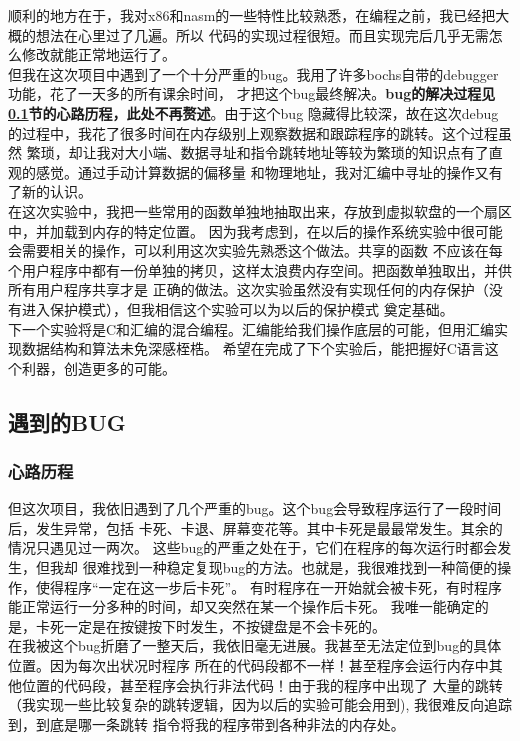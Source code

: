 \documentclass[a4paper]{article}
\begin{document}
    顺利的地方在于，我对x86和nasm的一些特性比较熟悉，在编程之前，我已经把大概的想法在心里过了几遍。所以
    代码的实现过程很短。而且实现完后几乎无需怎么修改就能正常地运行了。\\
    
    但我在这次项目中遇到了一个十分严重的bug。我用了许多bochs自带的debugger功能，花了一天多的所有课余时间，
    才把这个bug最终解决。\textbf{bug的解决过程见\ref{sec:bug}节的心路历程，此处不再赘述}。由于这个bug
    隐藏得比较深，故在这次debug的过程中，我花了很多时间在内存级别上观察数据和跟踪程序的跳转。这个过程虽然
    繁琐，却让我对大小端、数据寻址和指令跳转地址等较为繁琐的知识点有了直观的感觉。通过手动计算数据的偏移量
    和物理地址，我对汇编中寻址的操作又有了新的认识。\\
    
    在这次实验中，我把一些常用的函数单独地抽取出来，存放到虚拟软盘的一个扇区中，并加载到内存的特定位置。
    因为我考虑到，在以后的操作系统实验中很可能会需要相关的操作，可以利用这次实验先熟悉这个做法。共享的函数
    不应该在每个用户程序中都有一份单独的拷贝，这样太浪费内存空间。把函数单独取出，并供所有用户程序共享才是
    正确的做法。这次实验虽然没有实现任何的内存保护（没有进入保护模式），但我相信这个实验可以为以后的保护模式
    奠定基础。\\
    
    下一个实验将是C和汇编的混合编程。汇编能给我们操作底层的可能，但用汇编实现数据结构和算法未免深感桎梏。
    希望在完成了下个实验后，能把握好C语言这个利器，创造更多的可能。

    \subsection{遇到的BUG} \label{sec:bug}
        \subsubsection{心路历程}
    但这次项目，我依旧遇到了几个严重的bug。这个bug会导致程序运行了一段时间后，发生异常，包括
    卡死、卡退、屏幕变花等。其中卡死是最最常发生。其余的情况只遇见过一两次。
    这些bug的严重之处在于，它们在程序的每次运行时都会发生，但我却
    很难找到一种稳定复现bug的方法。也就是，我很难找到一种简便的操作，使得程序``一定在这一步后卡死''。
    有时程序在一开始就会被卡死，有时程序能正常运行一分多种的时间，却又突然在某一个操作后卡死。
    我唯一能确定的是，卡死一定是在按键按下时发生，不按键盘是不会卡死的。\\
    
    在我被这个bug折磨了一整天后，我依旧毫无进展。我甚至无法定位到bug的具体位置。因为每次出状况时程序
    所在的代码段都不一样！甚至程序会运行内存中其他位置的代码段，甚至程序会执行非法代码！由于我的程序中出现了
    大量的跳转（我实现一些比较复杂的跳转逻辑，因为以后的实验可能会用到), 我很难反向追踪到，到底是哪一条跳转
    指令将我的程序带到各种非法的内存处。\\
    
\end{document}
